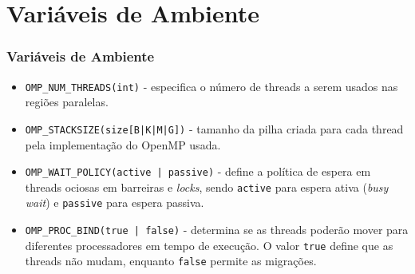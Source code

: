 \documentclass[xcolor={usenames,dvipsnames},12pt,presentation,aspectratio=169]{beamer}
\begin{document}
\section{Variáveis de Ambiente}

\begin{frame}[fragile]
  \frametitle{Variáveis de Ambiente}
    \begin{itemize}[<+->]
    \item \verb+OMP_NUM_THREADS(int)+ - especifica o número de threads a serem usados nas regiões paralelas.

    \item \verb+OMP_STACKSIZE(size[B|K|M|G])+ - tamanho da pilha criada para cada thread pela implementação do OpenMP usada.

    \item \verb+OMP_WAIT_POLICY(active | passive)+ - define a política de espera em
    threads ociosas em barreiras e \emph{locks}, sendo \verb+active+ para espera
    ativa (\emph{busy wait}) e \verb+passive+ para espera passiva.

    \item \verb+OMP_PROC_BIND(true | false)+ - determina se as threads poderão
    mover para diferentes processadores em tempo de execução.
    O valor \texttt{true} define que as threads  não mudam, enquanto \texttt{false}
    permite as migrações.
    \end{itemize}
\end{frame}
\end{document}
